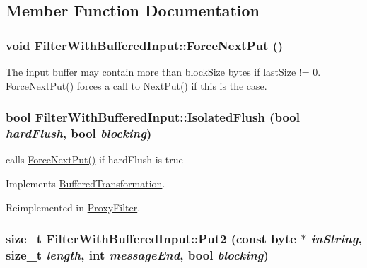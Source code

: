 \subsection{Member Function Documentation}
\hypertarget{class_filter_with_buffered_input_afa0096257c94f94c3a5938a0e826c46f}{
\subsubsection[{ForceNextPut}]{\setlength{\rightskip}{0pt plus 5cm}void FilterWithBufferedInput::ForceNextPut ()}}
\label{class_filter_with_buffered_input_afa0096257c94f94c3a5938a0e826c46f}
The input buffer may contain more than blockSize bytes if lastSize != 0. \hyperlink{class_filter_with_buffered_input_afa0096257c94f94c3a5938a0e826c46f}{ForceNextPut()} forces a call to NextPut() if this is the case. \hypertarget{class_filter_with_buffered_input_a4261e0491864a31738cf53b3f9343806}{
\subsubsection[{IsolatedFlush}]{\setlength{\rightskip}{0pt plus 5cm}bool FilterWithBufferedInput::IsolatedFlush (bool {\em hardFlush}, \/  bool {\em blocking})}}
\label{class_filter_with_buffered_input_a4261e0491864a31738cf53b3f9343806}
calls \hyperlink{class_filter_with_buffered_input_afa0096257c94f94c3a5938a0e826c46f}{ForceNextPut()} if hardFlush is true 

Implements \hyperlink{class_buffered_transformation}{BufferedTransformation}.

Reimplemented in \hyperlink{class_proxy_filter_ae5d15b0c5bcc601a58dde22e01ce9b79}{ProxyFilter}.\hypertarget{class_filter_with_buffered_input_a9885841f5ecee1403b57c5b1fc28a928}{
\subsubsection[{Put2}]{\setlength{\rightskip}{0pt plus 5cm}size\_\-t FilterWithBufferedInput::Put2 (const byte $\ast$ {\em inString}, \/  size\_\-t {\em length}, \/  int {\em messageEnd}, \/  bool {\em blocking})}}
\label{class_filter_with_buffered_input_a9885841f5ecee1403b57c5b1fc28a928}



